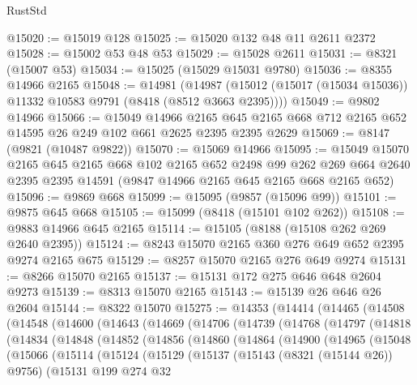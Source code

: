 \begin{lexlean}{RustStd}
\begin{coremodule}
@15020 := @15019 @128
@15025 := @15020 @132 @48 @11 @2611 @2372
@15028 := @15002 @53 @48 @53
@15029 := @15028 @2611
@15031 := @8321 (@15007 @53)
@15034 := @15025 (@15029 @15031 @9780)
@15036 := @8355 @14966 @2165
@15048 := @14981
    (@14987 (@15012 (@15017 (@15034 @15036)) @11332 @10583 @9791 (@8418 (@8512 @3663 @2395))))
@15049 := @9802 @14966
@15066 := @15049
    @14966
    @2165
    @645
    @2165
    @668
    @712
    @2165
    @652
    @14595
    @26
    @249
    @102
    @661
    @2625
    @2395
    @2395
    @2629
@15069 := @8147 (@9821 (@10487 @9822))
@15070 := @15069 @14966
@15095 := @15049
    @15070
    @2165
    @645
    @2165
    @668
    @102
    @2165
    @652
    @2498
    @99
    @262
    @269
    @664
    @2640
    @2395
    @2395
    @14591
    (@9847 @14966 @2165 @645 @2165 @668 @2165 @652)
@15096 := @9869 @668
@15099 := @15095 (@9857 (@15096 @99))
@15101 := @9875 @645 @668
@15105 := @15099 (@8418 (@15101 @102 @262))
@15108 := @9883 @14966 @645 @2165
@15114 := @15105 (@8188 (@15108 @262 @269 @2640 @2395))
@15124 := @8243 @15070 @2165 @360 @276 @649 @652 @2395 @9274 @2165 @675
@15129 := @8257 @15070 @2165 @276 @649 @9274
@15131 := @8266 @15070 @2165
@15137 := @15131 @172 @275 @646 @648 @2604 @9273
@15139 := @8313 @15070 @2165
@15143 := @15139 @26 @646 @26 @2604
@15144 := @8322 @15070
@15275 := @14353
    (@14414
      (@14465
        (@14508
          (@14548
            (@14600
              (@14643
                (@14669
                  (@14706
                    (@14739
                      (@14768
                        (@14797
                          (@14818
                            (@14834
                              (@14848
                                (@14852
                                  (@14856
                                    (@14860
                                      (@14864
                                        (@14900
                                          (@14965
                                            (@15048
                                              (@15066
                                                (@15114
                                                  (@15124
                                                    (@15129
                                                      (@15137
                                                        (@15143 (@8321 (@15144 @26)) @9756)
                                                        (@15131
                                                          @199
                                                          @274
                                                          @32

\end{coremodule}
\end{lexlean}
